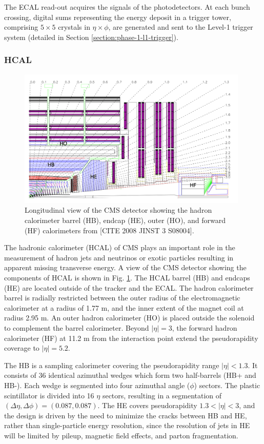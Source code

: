 \documentclass{article}
\begin{document}
The ECAL read-out acquires the signals of the photodetectors. At each bunch crossing, digital sums representing the energy deposit in a trigger tower, comprising $5 \times 5$ crystals in $\eta \times \phi$, are generated and sent to the Level-1 trigger system (detailed in Section \ref{section:phase-1-l1-trigger}).

\subsubsection{HCAL}
\begin{figure}[ht]
    \centering
    \includegraphics[width=11cm]{figures/phase-1-HCAL-schematic.png}
    \caption{Longitudinal view of the CMS detector showing the hadron calorimeter barrel (HB), endcap (HE), outer (HO), and forward (HF) calorimeters from [CITE 2008 JINST 3 S08004].}
    \label{fig:phase-1-HCAL-schematic}
\end{figure}

The hadronic calorimeter (HCAL) of CMS plays an important role in the measurement of hadron jets and neutrinos or exotic particles resulting in apparent missing transverse energy. A view of the CMS detector showing the components of HCAL is shown in Fig. \ref{fig:phase-1-HCAL-schematic}. The HCAL barrel (HB) and endcaps (HE) are located outside of the tracker and the ECAL. The hadron calorimeter barrel is radially restricted between the outer radius of the electromagnetic calorimeter at a radius of 1.77 m, and the inner extent of the magnet coil at radius 2.95 m. An outer hadron calorimeter (HO) is placed outside the solenoid to complement the barrel calorimeter. Beyond $|\eta| = 3$, the forward hadron calorimeter (HF) at 11.2 m from the interaction point extend the pseudorapidity coverage to $|\eta| = 5.2$.

The HB is a sampling calorimeter covering the pseudorapidity range $|\eta| < 1.3$. It consists of 36 identical azimuthal wedges which form two half-barrels (HB+ and HB-). Each wedge is segmented into four azimuthal angle ($\phi$) sectors. The plastic scintillator is divided into 16 $\eta$ sectors, resulting in a segmentation of $(\Delta \eta, \Delta \phi) = (0.087, 0.087)$. The HE covers pseudorapidity $1.3 < |\eta| < 3$, and the design is driven by the need to minimize the cracks between HB and HE, rather than single-particle energy resolution, since the resolution of jets in HE will be limited by pileup, magnetic field effects, and parton fragmentation. 
\end{document}
